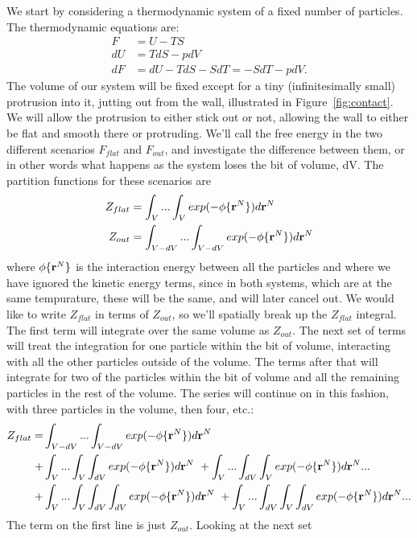 We start by considering a thermodynamic system of a fixed number of
particles.  The thermodynamic equations are:
\begin{align}
F &= U - TS \\
dU &= TdS -pdV \\
dF &= dU - TdS - SdT = -SdT - pdV.
\end{align}
The volume of our system will be fixed except for a tiny
(infinitesimally small) protrusion into it, jutting out from the wall,
illustrated in Figure~\ref{fig:contact}.  We will allow the protrusion
to either stick out or not, allowing the wall to either be flat and
smooth there or protruding.  We'll call the free energy in the two
different scenarios $F_{flat}$ and $F_{out}$, and investigate the
difference between them, or in other words what happens as the system
loses the bit of volume, dV.  The partition functions for these
scenarios are
\begin{align}
Z_{flat} &= \int_V... \int_V exp(-\phi \{\textbf{r}^N \})d\textbf{r}^N \\
Z_{out} &=  \int_{V-dV}... \int_{V-dV} exp(-\phi \{\textbf{r}^N \})d\textbf{r}^N
\end{align}
where $\phi \{\textbf{r}^N \}$ is the interaction energy between all the
particles and where we have ignored the kinetic energy terms, since in
both systems, which are at the same tempurature, these will be the
same, and will later cancel out.  We would like to write $Z_{flat}$ in
terms of $Z_{out}$, so we'll spatially break up the $Z_{flat}$
integral.  The first term will integrate over the same volume as
$Z_{out}$.  The next set of terms will treat the integration for one
particle within the bit of volume, interacting with all the other
particles outside of the volume.  The terms after that will integrate
for two of the particles within the bit of volume and all the
remaining particles in the rest of the volume.  The series will
continue on in this fashion, with three particles in the volume, then
four, etc.:
\begin{align}
Z_{flat} = &\int_{V-dV}... \int_{V-dV} exp(-\phi \{\textbf{r}^N \})d\textbf{r}^N \notag \\
+ &\int_V... \int_V \int_{dV} exp(-\phi \{ \textbf{r}^N \})d\textbf{r}^N \
+ \int_V ... \int_{dV} \int_V exp(-\phi \{ \textbf{r}^N \})d\textbf{r}^N ... \notag \\
+ &\int_V... \int_{V}\int_{dV} \int_{dV} exp(-\phi \{\textbf{r}^N \})d\textbf{r}^N \
+ \int_V... \int_{dV}\int_V \int_{dV} exp(-\phi \{\textbf{r}^N \})d\textbf{r}^N ...
\end{align}
The term on the first line is just $Z_{out}$.  Looking at the next set
